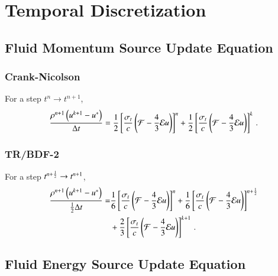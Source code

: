 \documentclass[preprint,12pt]{elsarticle}
\begin{document}
\section{Temporal Discretization}
\subsection{Fluid Momentum Source Update Equation}
\subsubsection{Crank-Nicolson}
For a step $t^n\rightarrow t^{n+1}$,
\begin{equation}
  \frac{\rho^{n+1}\left(u^{k+1}-u^*\right)}{\Delta t} = 
   \frac{1}{2}\left[\frac{\sigma_{t}}{c}\left(\mathcal{F}-\frac{4}{3}\mathcal{E} u\right)\right]^n
  +\frac{1}{2}\left[\frac{\sigma_{t}}{c}\left(\mathcal{F}-\frac{4}{3}\mathcal{E} u\right)\right]^k
  \, .
\end{equation}

\subsubsection{TR/BDF-2}
For a step $t^{n+\frac{1}{2}}\rightarrow t^{n+1}$,
\begin{equation}\begin{split}
  \frac{\rho^{n+1}\left(u^{k+1}-u^*\right)}{\frac{1}{2}\Delta t} =  
  & \frac{1}{6}\left[\frac{\sigma_{t}}{c}\left(\mathcal{F}-\frac{4}{3}\mathcal{E} u\right)\right]^n
   +\frac{1}{6}\left[\frac{\sigma_{t}}{c}\left(\mathcal{F}-\frac{4}{3}\mathcal{E} u\right)\right]^{n+\frac{1}{2}}\\
  &+\frac{2}{3}\left[\frac{\sigma_{t}}{c}\left(\mathcal{F}-\frac{4}{3}\mathcal{E} u\right)\right]^{k+1}
  \, .
\end{split}\end{equation}

\subsection{Fluid Energy Source Update Equation}
\end{document}
